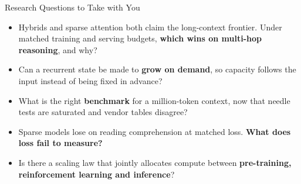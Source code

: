 \begin{frame}{Research Questions to Take with You}
    \begin{itemize}\itemsep0.65em
        \item Hybrids and sparse attention both claim the long-context frontier. Under matched training and serving budgets, \textbf{which wins on multi-hop reasoning}, and why?
        \item Can a recurrent state be made to \textbf{grow on demand}, so capacity follows the input instead of being fixed in advance?
        \item What is the right \textbf{benchmark} for a million-token context, now that needle tests are saturated and vendor tables disagree?
        \item Sparse models lose on reading comprehension at matched loss. \textbf{What does loss fail to measure?}
        \item Is there a scaling law that jointly allocates compute between \textbf{pre-training, reinforcement learning and inference}?
    \end{itemize}
\end{frame}
